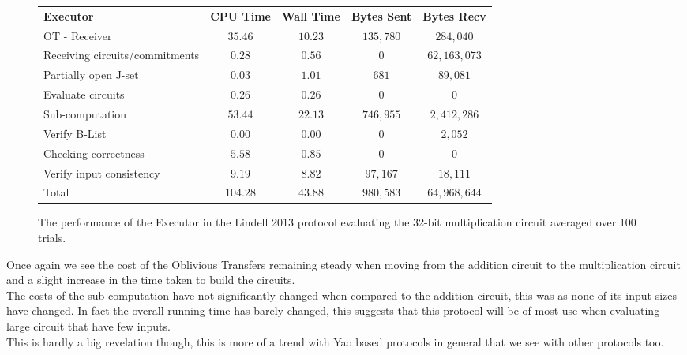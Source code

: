 \documentclass[ %
                    author={Nicholas Tutte},
                supervisor={Prof. Nigel Smart},
                    degree={MEng},
                     title={Secure Two Party Computation},
                  subtitle={A practical comparison of recent protocols},
                      type={Research - GG1K},
                      year={2015} ]{dissertation}
\begin{document}
				\begin{figure}[!ht]
					\begin{tabular}{| p{4.3cm} | c c c c |}
						\hline
						\textbf{Executor} & \textbf{CPU Time} & \textbf{Wall Time} & \textbf{Bytes Sent} & \textbf{Bytes Recv} \\
						\thickhline
						OT - Receiver & $35.46$ & $10.23$ & $135,780$ & $284,040$ \\
						\hline
						Receiving circuits/commitments & $0.28$ & $0.56$ & $0$ & $62,163,073$ \\
						\hline
						Partially open J-set & $0.03$ & $1.01$ & $681$ & $89,081$ \\
						\hline
						Evaluate circuits & $0.26$ & $0.26$ & $0$ & $0$ \\
						\hline
						Sub-computation & $53.44$ & $22.13$ & $746,955$ & $2,412,286$ \\
						\hline
						Verify B-List & $0.00$ & $0.00$ & $0$ & $2,052$ \\
						\hline
						Checking correctness & $5.58$ & $0.85$ & $0$ & $0$ \\
						\hline
						Verify input consistency & $9.19$ & $8.82$ & $97,167$ & $18,111$ \\
						\thickhline
						Total & $104.28$ & $43.88$ & $980,583$ & $64,968,644$ \\
						\hline
					\end{tabular}
					\caption{The performance of the Executor in the Lindell 2013 protocol evaluating the 32-bit multiplication circuit averaged over 100 trials.\label{table:L_2013_Mul_Executor} }
				\end{figure}
				\FloatBarrier

				Once again we see the cost of the Oblivious Transfers remaining steady when moving from the addition circuit to the multiplication circuit and a slight increase in the time taken to build the circuits. \\

				The costs of the sub-computation have not significantly changed when compared to the addition circuit, this was  as none of its input sizes have changed. In fact the overall running time has barely changed, this suggests that this protocol will be of most use when evaluating large circuit that have few inputs.\\

				This is hardly a big revelation though, this is more of a trend with Yao based protocols in general that we see with other protocols too.\\
\end{document}

